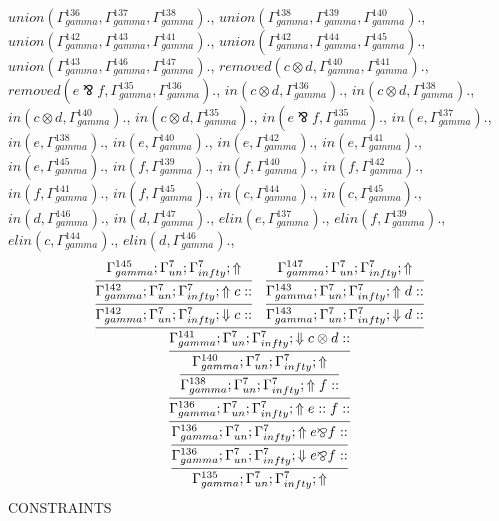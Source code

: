\documentclass[a4paper, 11pt]{article}
\begin{document}
$union(\Gamma_{gamma}^{136}, \Gamma_{gamma}^{137}, \Gamma_{gamma}^{138}).$, $union(\Gamma_{gamma}^{138}, \Gamma_{gamma}^{139}, \Gamma_{gamma}^{140}).$, $union(\Gamma_{gamma}^{142}, \Gamma_{gamma}^{143}, \Gamma_{gamma}^{141}).$, $union(\Gamma_{gamma}^{142}, \Gamma_{gamma}^{144}, \Gamma_{gamma}^{145}).$, $union(\Gamma_{gamma}^{143}, \Gamma_{gamma}^{146}, \Gamma_{gamma}^{147}).$, $removed(c \otimes d, \Gamma_{gamma}^{140}, \Gamma_{gamma}^{141}).$, $removed(e \bindnasrepma f, \Gamma_{gamma}^{135}, \Gamma_{gamma}^{136}).$, $in(c \otimes d, \Gamma_{gamma}^{136}).$, $in(c \otimes d, \Gamma_{gamma}^{138}).$, $in(c \otimes d, \Gamma_{gamma}^{140}).$, $in(c \otimes d, \Gamma_{gamma}^{135}).$, $in(e \bindnasrepma f, \Gamma_{gamma}^{135}).$, $in(e, \Gamma_{gamma}^{137}).$, $in(e, \Gamma_{gamma}^{138}).$, $in(e, \Gamma_{gamma}^{140}).$, $in(e, \Gamma_{gamma}^{142}).$, $in(e, \Gamma_{gamma}^{141}).$, $in(e, \Gamma_{gamma}^{145}).$, $in(f, \Gamma_{gamma}^{139}).$, $in(f, \Gamma_{gamma}^{140}).$, $in(f, \Gamma_{gamma}^{142}).$, $in(f, \Gamma_{gamma}^{141}).$, $in(f, \Gamma_{gamma}^{145}).$, $in(c, \Gamma_{gamma}^{144}).$, $in(c, \Gamma_{gamma}^{145}).$, $in(d, \Gamma_{gamma}^{146}).$, $in(d, \Gamma_{gamma}^{147}).$, $elin(e, \Gamma_{gamma}^{137}).$, $elin(f, \Gamma_{gamma}^{139}).$, $elin(c, \Gamma_{gamma}^{144}).$, $elin(d, \Gamma_{gamma}^{146}).$, 
{\small
\[
\infer{\Gamma_{ gamma}^{135} ; \Gamma_{un}^{7} ; \Gamma_{ infty}^{7} ;  \Uparrow }
{\infer{\Gamma_{ gamma}^{136} ; \Gamma_{un}^{7} ; \Gamma_{ infty}^{7} ;  \Downarrow e \bindnasrepma f :: }
{\infer{\Gamma_{ gamma}^{136} ; \Gamma_{un}^{7} ; \Gamma_{ infty}^{7} ;  \Uparrow e \bindnasrepma f :: }
{\infer{\Gamma_{ gamma}^{136} ; \Gamma_{un}^{7} ; \Gamma_{ infty}^{7} ;  \Uparrow e :: f :: }
{\infer{\Gamma_{ gamma}^{138} ; \Gamma_{un}^{7} ; \Gamma_{ infty}^{7} ;  \Uparrow f :: }
{\infer{\Gamma_{ gamma}^{140} ; \Gamma_{un}^{7} ; \Gamma_{ infty}^{7} ;  \Uparrow }
{\infer{\Gamma_{ gamma}^{141} ; \Gamma_{un}^{7} ; \Gamma_{ infty}^{7} ;  \Downarrow c \otimes d :: }
{\infer{\Gamma_{ gamma}^{142} ; \Gamma_{un}^{7} ; \Gamma_{ infty}^{7} ;  \Downarrow c :: }
{\infer{\Gamma_{ gamma}^{142} ; \Gamma_{un}^{7} ; \Gamma_{ infty}^{7} ;  \Uparrow c :: }
{\Gamma_{ gamma}^{145} ; \Gamma_{un}^{7} ; \Gamma_{ infty}^{7} ;  \Uparrow }}
&
\infer{\Gamma_{ gamma}^{143} ; \Gamma_{un}^{7} ; \Gamma_{ infty}^{7} ;  \Downarrow d :: }
{\infer{\Gamma_{ gamma}^{143} ; \Gamma_{un}^{7} ; \Gamma_{ infty}^{7} ;  \Uparrow d :: }
{\Gamma_{ gamma}^{147} ; \Gamma_{un}^{7} ; \Gamma_{ infty}^{7} ;  \Uparrow }}}}}}}}}
\]
}
CONSTRAINTS
\end{document}
